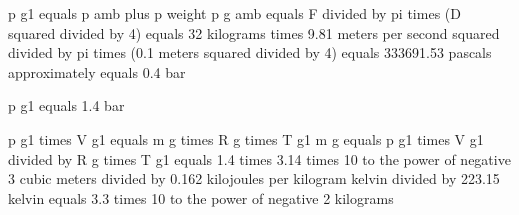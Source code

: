 p g1 equals p amb plus p weight  
p g amb equals F divided by pi times (D squared divided by 4) equals 32 kilograms times 9.81 meters per second squared divided by pi times (0.1 meters squared divided by 4) equals 333691.53 pascals approximately equals 0.4 bar  

p g1 equals 1.4 bar  

p g1 times V g1 equals m g times R g times T g1  
m g equals p g1 times V g1 divided by R g times T g1 equals 1.4 times 3.14 times 10 to the power of negative 3 cubic meters divided by 0.162 kilojoules per kilogram kelvin divided by 223.15 kelvin equals 3.3 times 10 to the power of negative 2 kilograms
